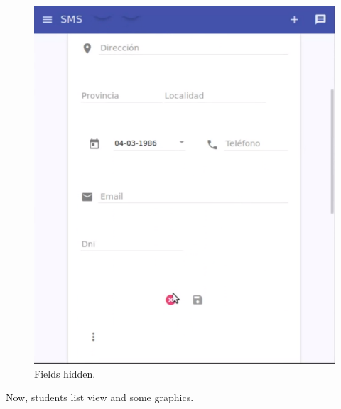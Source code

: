 \begin{figure}[H]
\begin{minipage}{.5\textwidth}
  \includegraphics[scale=0.3]{img/snaps/teacher_profile_update2.png}
  \caption{Fields hidden.}
\end{minipage}
\end{figure}

\noindent Now, students list view and some graphics.

